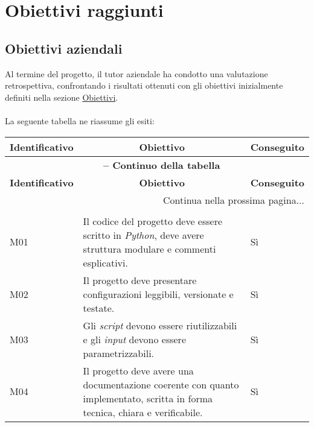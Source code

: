 \section{Obiettivi raggiunti}
\subsection*{Obiettivi aziendali}
Al termine del progetto, il tutor aziendale ha condotto una valutazione retrospettiva, confrontando i risultati ottenuti con gli obiettivi inizialmente definiti nella sezione \hyperref[tab:obiettivi]{Obiettivi}.\\\\
La seguente tabella ne riassume gli esiti:
\begin{center}
\begin{longtable}{|p{}|p{}|p{}|}
\hline
\multicolumn{1}{|c|}{\textbf{Identificativo}} & 
\multicolumn{1}{c|}{\textbf{Obiettivo}} & 
\multicolumn{1}{c|}{\textbf{Conseguito}} \\ 
\hline
\endfirsthead

\multicolumn{3}{c}{{\bfseries \tablename\ \thetable{} -- Continuo della tabella}}\\
\hline
\multicolumn{1}{|c|}{\textbf{Identificativo}} & 
\multicolumn{1}{c|}{\textbf{Obiettivo}} & 
\multicolumn{1}{c|}{\textbf{Conseguito}} \\ \hline 
\endhead

\hline
\multicolumn{3}{|r|}{{Continua nella prossima pagina...}}\\
\hline
\endfoot
\endlastfoot 

\multicolumn{3}{|c|}{\textbf{Obiettivi Minimi}} \\ \hline
M01 & Il codice del progetto deve essere scritto in \textit{Python}, deve avere struttura modulare e commenti esplicativi. & Sì \\ \hline
M02 & Il progetto deve presentare configurazioni leggibili, versionate e testate. & Sì \\ \hline
M03 & Gli \textit{script} devono essere riutilizzabili e gli \textit{input} devono essere parametrizzabili. & Sì \\ \hline
M04 & Il progetto deve avere una documentazione coerente con quanto implementato, scritta in forma tecnica, chiara e verificabile. & Sì \\ \hline


\end{longtable}
\end{center}
